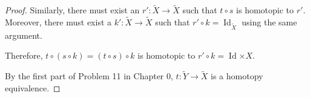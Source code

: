 \documentclass[12pt, psamsfonts]{amsart}
\theoremstyle{definition}
\theoremstyle{remark}
\DeclareMathOperator{\Id}{Id}
\numberwithin{equation}{section}
\begin{document}
\begin{proof}
  Similarly, there must exist an $r': \tilde{X} \rightarrow \tilde{X}$ such that $t \circ s$ is homotopic to $r'$.
  Moreover, there must exist a $k': \tilde{X} \rightarrow \tilde{X}$ such that $r' \circ k = \Id_{\tilde{X}}$ using the same argument.

  Therefore, $t \circ (s \circ k) = (t \circ s) \circ k$ is homotopic to $r' \circ k = \Id{\times{X}}$.

  By the first part of Problem 11 in Chapter 0, $t: \tilde{Y} \rightarrow \tilde{X}$ is a homotopy equivalence.
\end{proof}
\end{document}
